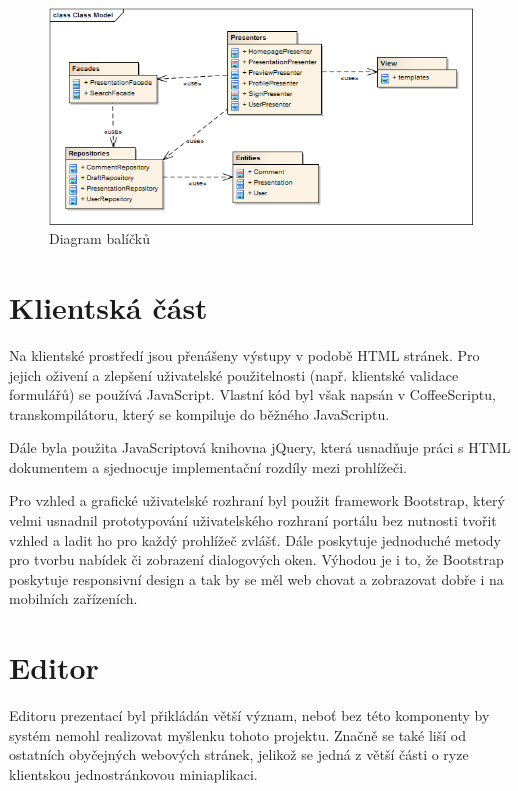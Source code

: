 \documentclass[11pt,twoside,a4paper]{book}
\begin{document}
\begin{figure}[ht]
	\begin{center}
		\includegraphics[width=14cm]{PRO-img/balicky.png}
		\caption{Diagram balíčků}
		\label{fig:balicky}
	\end{center}
\end{figure}


\section{Klientská část}
Na klientské prostředí jsou přenášeny výstupy v podobě HTML stránek. Pro jejich oživení a zlepšení uživatelské použitelnosti (např. klientské validace formulářů) se používá JavaScript. Vlastní kód byl však napsán v CoffeeScriptu\cite{coffee}, transkompilátoru, který se kompiluje do běžného JavaScriptu. 

Dále byla použita JavaScriptová knihovna jQuery\cite{jQuery}, která usnadňuje práci s HTML dokumentem a sjednocuje implementační rozdíly mezi prohlížeči.

Pro vzhled a grafické uživatelské rozhraní byl použit framework Bootstrap\cite{bootstrap}, který velmi usnadnil prototypování uživatelského rozhraní portálu bez nutnosti tvořit vzhled a ladit ho pro každý prohlížeč zvlášť. Dále poskytuje jednoduché metody pro tvorbu nabídek či zobrazení dialogových oken. Výhodou je i to, že Bootstrap poskytuje responsivní design a tak by se měl web chovat a zobrazovat dobře i na mobilních zařízeních.


\section{Editor}
Editoru prezentací byl přikládán větší význam, neboť bez této komponenty by systém nemohl realizovat myšlenku tohoto projektu. Značně se také liší od ostatních obyčejných webových stránek, jelikož se jedná z větší části o ryze klientskou jednostránkovou miniaplikaci.
\end{document}
